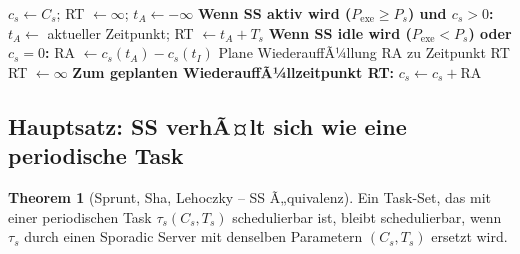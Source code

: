 ﻿\documentclass[a4paper,12pt]{report}
\theoremstyle{definition}
\newtheorem{theorem}{Theorem}[chapter]
\begin{document}
\begin{algorithm}[H]
	\caption{Sporadic Server}
	\begin{algorithmic}[1]
		\State $c_s \leftarrow C_s$; RT $\leftarrow \infty$; $t_A \leftarrow -\infty$
		\State
		\State \textbf{Wenn SS aktiv wird ($P_{\text{exe}} \geq P_s$) und $c_s > 0$:}
		\State $t_A \leftarrow$ aktueller Zeitpunkt; RT $\leftarrow t_A + T_s$
		\EndIf
		\State
		\State \textbf{Wenn SS idle wird ($P_{\text{exe}} < P_s$) oder $c_s = 0$:}
		\State RA $\leftarrow c_s(t_A) - c_s(t_I)$ 
		\State Plane WiederauffÃ¼llung RA zu Zeitpunkt RT
		\State RT $\leftarrow \infty$ 
		\State
		\State \textbf{Zum geplanten WiederauffÃ¼llzeitpunkt RT:}
		\State $c_s \leftarrow c_s + \mathrm{RA}$
	\end{algorithmic}
\end{algorithm}

\subsection{Hauptsatz: SS verhÃ¤lt sich wie eine periodische Task}

\begin{theorem}[Sprunt, Sha, Lehoczky -- SS Ã„quivalenz]
	\label{thm:ss}
	Ein Task-Set, das mit einer periodischen Task $\tau_s(C_s, T_s)$ schedulierbar
	ist, bleibt schedulierbar, wenn $\tau_s$ durch einen Sporadic Server mit
	denselben Parametern $(C_s, T_s)$ ersetzt wird.
\end{theorem}
\end{document}
